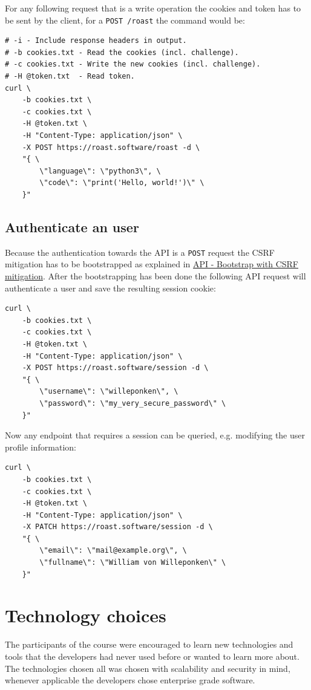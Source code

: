 \documentclass[12pt,a4paper]{report}
\begin{document}
\newpage
For any following request that is a write operation the cookies and token has to be sent by the client, for a \texttt{POST /roast} the command would be:
\begin{verbatim}
# -i - Include response headers in output.
# -b cookies.txt - Read the cookies (incl. challenge).
# -c cookies.txt - Write the new cookies (incl. challenge).
# -H @token.txt  - Read token.
curl \
    -b cookies.txt \
    -c cookies.txt \
    -H @token.txt \
    -H "Content-Type: application/json" \
    -X POST https://roast.software/roast -d \
    "{ \
        \"language\": \"python3\", \
        \"code\": \"print('Hello, world!')\" \
    }"
\end{verbatim}

\section{Authenticate an user}
Because the authentication towards the API is a \texttt{POST} request the CSRF mitigation has to be bootstrapped as explained in \hyperref[sec:api-bootstrap]{API - Bootstrap with CSRF mitigation}. After the bootstrapping has been done the following API request will authenticate a user and save the resulting session cookie:
\begin{verbatim}
curl \
    -b cookies.txt \
    -c cookies.txt \
    -H @token.txt \
    -H "Content-Type: application/json" \
    -X POST https://roast.software/session -d \
    "{ \
        \"username\": \"willeponken\", \
        \"password\": \"my_very_secure_password\" \
    }"
\end{verbatim}

Now any endpoint that requires a session can be queried, e.g. modifying the user profile information:
\begin{verbatim}
curl \
    -b cookies.txt \
    -c cookies.txt \
    -H @token.txt \
    -H "Content-Type: application/json" \
    -X PATCH https://roast.software/session -d \
    "{ \
        \"email\": \"mail@example.org\", \
        \"fullname\": \"William von Willeponken\" \
    }"
\end{verbatim}

\chapter{Technology choices}
The participants of the course were encouraged to learn new technologies and tools that the developers had never used before or wanted to learn more about. The technologies chosen all was chosen with scalability and security in mind, whenever applicable the developers chose enterprise grade software.
\end{document}
